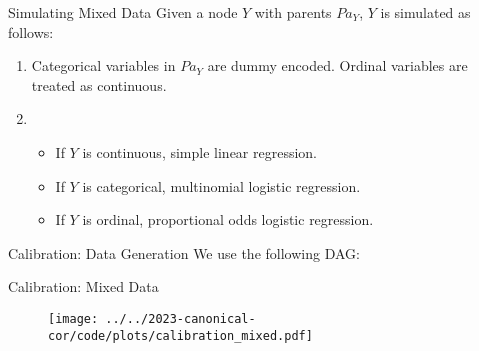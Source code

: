 \documentclass{beamer}
\begin{document}
\begin{frame}{Simulating Mixed Data}
	Given a node $ Y $ with parents $ Pa_Y $, $ Y $ is simulated as follows:
	\begin{enumerate}
		\item Categorical variables in $ Pa_Y $ are dummy encoded. Ordinal variables are treated as continuous.
		\item \begin{itemize}
			\item If $ Y $ is continuous, simple linear regression.
			\item If $ Y $ is categorical, multinomial logistic regression.
			\item If $ Y $ is ordinal, proportional odds logistic regression.
		\end{itemize}
	\end{enumerate}
\end{frame}

\begin{frame}{Calibration: Data Generation}
	We use the following DAG:
\begin{center}
\end{center}

\end{frame}

\begin{frame}{Calibration: Mixed Data}
	\begin{figure}[t]
		\centering
		\texttt{[image: ../../2023-canonical-cor/code/plots/calibration\_mixed.pdf]}
	\end{figure}
\end{frame}
\end{document}
